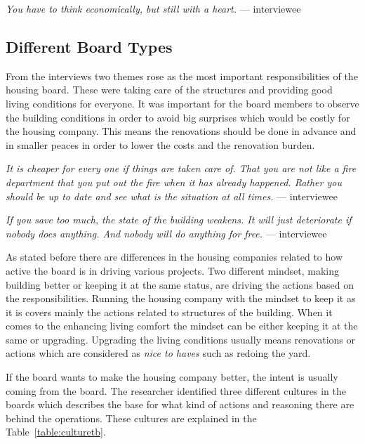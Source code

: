 \begin{displayquote}
\textit{You have to think economically, but still with a heart.} --- interviewee
\end{displayquote}

\subsection{Different Board Types}

From the interviews two themes rose as the most important responsibilities of the housing board. These were taking care of the structures and providing good living conditions for everyone. It was important for the board members to observe the building conditions in order to avoid big surprises which would be costly for the housing company. This means the renovations should be done in advance and in smaller peaces in order to lower the costs and the renovation burden.   

\begin{displayquote}
\textit{It is cheaper for every one if things are taken care of. That you are not like a fire department that you put out the fire when it has already happened. Rather you should be up to date and see what is the situation at all times.} --- interviewee
\end{displayquote}

\begin{displayquote}
\textit{If you save too much, the state of the building weakens. It will just deteriorate if nobody does anything. And nobody will do anything for free.} --- interviewee
\end{displayquote}

As stated before there are differences in the housing companies related to how active the board is in driving various projects. Two different mindset, making building better or keeping it at the same status, are driving the actions based on the responsibilities. Running the housing company with the mindset to keep it as it is covers mainly the actions related to structures of the building. When it comes to the enhancing living comfort the mindset can be either keeping it at the same or upgrading. Upgrading the living conditions usually means renovations or actions which are considered as \emph{nice to haves} such as redoing the yard. 

If the board wants to make the housing company better, the intent is usually coming from the board. The researcher identified three different cultures in the boards which describes the base for what kind of actions and reasoning there are behind the operations. These cultures are explained in the Table~\ref{table:culturetb}.

